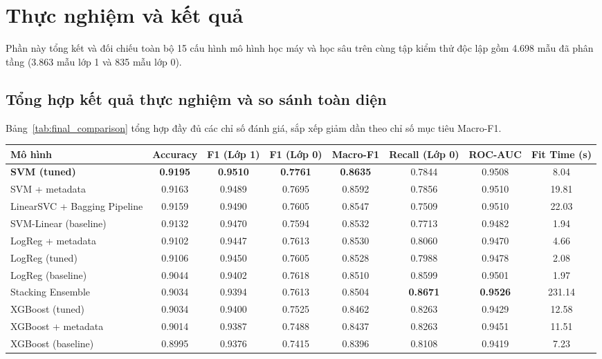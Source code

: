 \section{Thực nghiệm và kết quả}

Phần này tổng kết và đối chiếu toàn bộ 15 cấu hình mô hình học máy và học sâu trên cùng tập kiểm thử độc lập gồm 4.698 mẫu đã phân tầng (3.863 mẫu lớp 1 và 835 mẫu lớp 0).

\subsection{Tổng hợp kết quả thực nghiệm và so sánh toàn diện}
Bảng~\ref{tab:final_comparison} tổng hợp đầy đủ các chỉ số đánh giá, sắp xếp giảm dần theo chỉ số mục tiêu Macro-F1.

\begin{table}[H]
\centering
\small
\setlength{\tabcolsep}{3.5pt}
\begin{tabular}{|l|c|c|c|c|c|c|c|}
\hline
\textbf{Mô hình} & \textbf{Accuracy} & \textbf{F1 (Lớp 1)} & \textbf{F1 (Lớp 0)} & \textbf{Macro-F1} & \textbf{Recall (Lớp 0)} & \textbf{ROC-AUC} & \textbf{Fit Time (s)} \\ \hline
\textbf{SVM (tuned)} & \textbf{0.9195} & \textbf{0.9510} & \textbf{0.7761} & \textbf{0.8635} & 0.7844 & 0.9508 & 8.04 \\ \hline
SVM + metadata & 0.9163 & 0.9489 & 0.7695 & 0.8592 & 0.7856 & 0.9510 & 19.81 \\ \hline
LinearSVC + Bagging Pipeline & 0.9159 & 0.9490 & 0.7605 & 0.8547 & 0.7509 & 0.9510 & 22.03 \\ \hline
SVM-Linear (baseline) & 0.9132 & 0.9470 & 0.7594 & 0.8532 & 0.7713 & 0.9482 & 1.94 \\ \hline
LogReg + metadata & 0.9102 & 0.9447 & 0.7613 & 0.8530 & 0.8060 & 0.9470 & 4.66 \\ \hline
LogReg (tuned) & 0.9106 & 0.9450 & 0.7605 & 0.8528 & 0.7988 & 0.9478 & 2.08 \\ \hline
LogReg (baseline) & 0.9044 & 0.9402 & 0.7618 & 0.8510 & 0.8599 & 0.9501 & 1.97 \\ \hline
Stacking Ensemble & 0.9034 & 0.9394 & 0.7613 & 0.8504 & \textbf{0.8671} & \textbf{0.9526} & 231.14 \\ \hline
XGBoost (tuned) & 0.9034 & 0.9400 & 0.7525 & 0.8462 & 0.8263 & 0.9429 & 12.58 \\ \hline
XGBoost + metadata & 0.9014 & 0.9387 & 0.7488 & 0.8437 & 0.8263 & 0.9451 & 11.51 \\ \hline
XGBoost (baseline) & 0.8995 & 0.9376 & 0.7415 & 0.8396 & 0.8108 & 0.9419 & 7.23 \\ \hline

\end{tabular}
\end{table}
